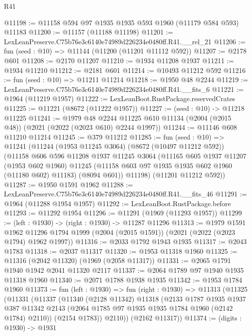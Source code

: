 \begin{lexlean}{R41}
\begin{coremodule}
@11198 := @11158 @594 @97 @1935 @1935 @593 @1960 (@11179 @584 @593) @11183
@11200 := @11157 (@11188 @11198)
@11201 := LexLeanPreserve.C75b76e3c6140e74989d226234e0480ff.R41.__rel_21
@11206 := fun (seed : @10) => @11144 (@11200 (@11201 @11112 @592))
@11207 := @2178 @601
@11208 := @2170 @11207
@11210 := @1934 @11208 @1937
@11211 := @1934 @11210
@11212 := @2181 @601
@11214 := @10493 @11212 @592
@11216 := fun (seed : @10) => @11211 @11214
@11218 := @1950 @48 @2244
@11219 := LexLeanPreserve.C75b76e3c6140e74989d226234e0480ff.R41.__fits_6
@11221 := @1964 (@11219 @1957)
@11222 := LexLeanBoot.RustPackage.reservedCrates
@11225 := @11221 (@8672 (@11222 @1957))
@11227 := (seed : @10) -> @11218 @11225
@11241 := @1979
    @48
    @2244
    @11225
    @610
    @11134
    (@2004 (@2015 @48))
    (@2021 (@2022 (@2023 @610) @2244 @1997))
@11244 := @11146 @608 @11210 @11214
@11245 := @379 @11212
@11285 := fun (seed : @10) =>
  @11241
    (@11244
      (@1953 @11245 @3064)
      (@8672 (@10497 @11212 @592))
      (@11158
        @606
        @596
        @11208
        @1937
        @11245
        @3064
        (@11165
          @605
          @1937
          @11207
          (@1953 @602 @1960)
          @11245
          (@11158 @603 @97 @1935 @1935 @602 @1960 (@11180 @602) @11183)
          (@8094 @601))
        @11198)
      (@11201 @11212 @592))
@11287 := @1950 @1591 @1962
@11288 := LexLeanPreserve.C75b76e3c6140e74989d226234e0480ff.R41.__fits_46
@11291 := @1964 (@11288 @1954 @1957)
@11292 := LexLeanBoot.RustPackage.before
@11293 := @11292 @1954
@11296 := @11291 (@1969 (@11293 @1957))
@11299 := (left : @1930) -> (right : @1930) -> @11287 @11296
@11313 := @1979
    @1591
    @1962
    @11296
    @1794
    @1999
    (@2004 (@2015 @1591))
    (@2021 (@2022 (@2023 @1794) @1962 @1997))
@11316 := @2033 @1792 @1943 @1935
@11317 := @2043 @1783
@11318 := @2037 @11317
@11320 := @1953 @11318 @1960
@11325 := @11316 (@2042 @11320) (@1969 (@2058 @11317))
@11331 := @2065 @1791 @1940 @1942 @2041 @11320 @2117
@11337 := @2064 @1789 @97 @1940 @1935 @11318 @1960
@11340 := @2071 @1788 @1938 @1935
@11342 := @1953 @1784 @1960
@11373 := fun (left : @1930) =>
  fun (right : @1930) =>
  @11313
    (@11325
      (@11331
        (@11337
          (@11340
            (@2128 @11342)
            @11318
            (@2133
              @1787
              @1935
              @1937
              @387
              @11342
              @2143
              (@2064 @1785 @97 @1935 @1935 @1784 @1960 (@2142 @1784) @2110))
            (@2154 @1783))
          @2110))
      (@2162 @11317))
@11374 := (digits : @1930) -> @1931

\end{coremodule}
\end{lexlean}
